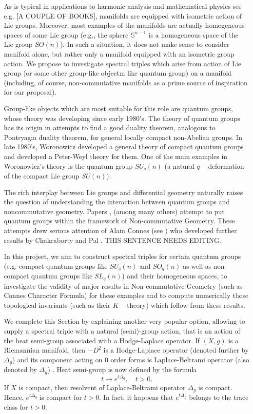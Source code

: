 \documentclass{article}
\begin{document}
As is typical in applications to harmonic analysis and mathematical physics {\color{red} see e.g. [A COUPLE OF BOOKS]}, manifolds are equipped with isometric action of Lie groups. Moreover, most examples of the manifolds are actually homogeneous spaces of some Lie group (e.g., the sphere $\mathbb{S}^{n-1}$ is a homogeneous space of the Lie group $SO(n)$). In such a situation, it does not make sense to consider manifold alone, but rather only a manifold equipped with an isometric group action. We propose to investigate spectral triples which arise from action of Lie group (or some other group-like objectm like quantum group) on a manifold (including, of course, non-commutative manifolds as a prime source of inspiration for our proposal).

Group-like objects which are most suitable for this role are quantum groups, whose theory was developing since early 1980's. The theory of quantum groups has its origin in attempts to find a good duality theorem, analogous to Pontryagin duality theorem, for general locally compact non-Abelian groups. In late 1980's, Woronowicz developed a general theory of compact quantum groups and developed a Peter-Weyl theory for them. One of the main examples in Woronowicz's theory is the quantum group $SU_q(n)$ (a natural $q-$deformation of the compact Lie group $SU(n)$). 

The rich interplay between Lie groups and differential geometry naturally raises the question of understanding the interaction between quantum groups and noncommutative geometry. Papers \cite{ChakrabortyPal}, \cite{NeshTus} (among many others) attempt to put quantum groups within the framework of Non-commutative Geometry. These attempts drew serious attention of Alain Connes (see \cite{Connes-suq2}) who developed further results by Chakraborty and Pal \cite{ChakrabortyPal}. {\color{blue} THIS SENTENCE NEEDS EDITING.}

In this project, we aim to construct spectral triples for certain quantum groups (e.g. compact quantum groups like $SU_q(n)$ and $SO_q(n)$ as well as non-compact quantum groups like $SL_q(n)$) and their homogeneous spaces, to investigate the validity of major results in Non-commutative Geometry (such as Connes Character Formula) for these examples and to compute numerically those topological invariants (such as their $K-$theory) which follow from these results.

We complete this Section by explaining another very popular option, allowing to supply a spectral triple with a natural (semi)-group action, that is an action of the heat semi-group associated with a Hodge-Laplace operator. If $(X,g)$ is a Riemannian manifold, then $-D^2$ is a Hodge-Laplace operator (denoted further by $\Delta_g$) and its component acting on $0$ order forms is Laplace-Beltrami operator (also denoted by $\Delta_g$) \cite{Rosenberg}. Heat semi-group is now defined by the formula
$$t\to e^{t\Delta_g},\quad t>0.$$
If $X$ is compact, then resolvent of Laplace-Beltrami operator $\Delta_g$ is compact. Hence, $e^{t\Delta_g}$ is compact for $t>0.$ In fact, it happens that $e^{t\Delta_g}$ belongs to the trace class for $t>0.$
\end{document}
